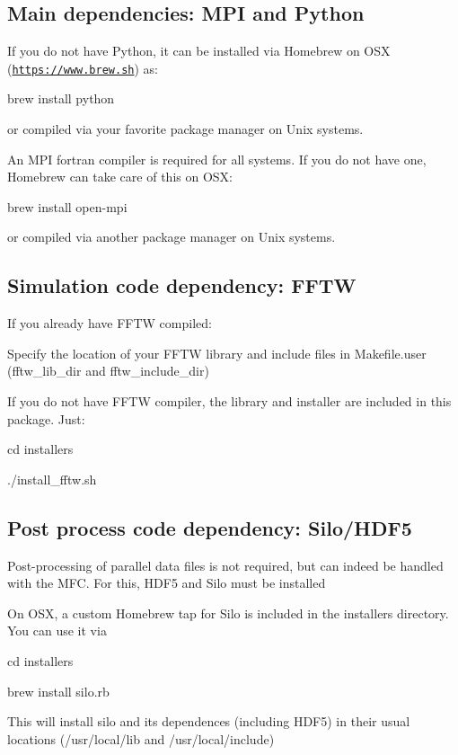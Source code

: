 \subsection*{Main dependencies\+: M\+PI and Python}

If you do not have Python, it can be installed via Homebrew on O\+SX (\href{https://www.brew.sh}{\tt https\+://www.\+brew.\+sh}) as\+: \begin{DoxyItemize}
\item brew install python\end{DoxyItemize}
or compiled via your favorite package manager on Unix systems.

An M\+PI fortran compiler is required for all systems. If you do not have one, Homebrew can take care of this on O\+SX\+: \begin{DoxyItemize}
\item brew install open-\/mpi\end{DoxyItemize}
or compiled via another package manager on Unix systems.

\subsection*{Simulation code dependency\+: F\+F\+TW}

If you already have F\+F\+TW compiled\+: \begin{DoxyItemize}
\item Specify the location of your F\+F\+TW library and include files in Makefile.\+user (fftw\+\_\+lib\+\_\+dir and fftw\+\_\+include\+\_\+dir)\end{DoxyItemize}
If you do not have F\+F\+TW compiler, the library and installer are included in this package. Just\+: \begin{DoxyItemize}
\item cd installers \item ./install\+\_\+fftw.sh\end{DoxyItemize}
\subsection*{Post process code dependency\+: Silo/\+H\+D\+F5}

Post-\/processing of parallel data files is not required, but can indeed be handled with the M\+FC. For this, H\+D\+F5 and Silo must be installed

On O\+SX, a custom Homebrew tap for Silo is included in the installers directory. You can use it via \begin{DoxyItemize}
\item cd installers \item brew install silo.\+rb\end{DoxyItemize}
This will install silo and its dependences (including H\+D\+F5) in their usual locations (/usr/local/lib and /usr/local/include)

